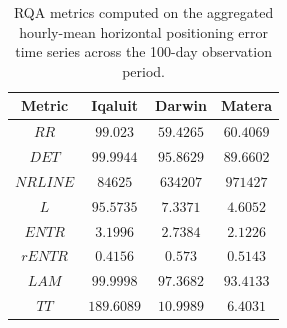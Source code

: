 \vspace{-3pt}
\begin{table}[H]
\caption{RQA metrics computed on the aggregated hourly-mean horizontal positioning error time series across the 100-day observation period.\label{tab:hourly_mean_rqa}}
\begin{tabularx}{\textwidth}{CCCC}
\toprule
\textbf{Metric} & \textbf{Iqaluit} & \textbf{Darwin} & \textbf{Matera} \\
\midrule
$RR$ & $99.023$ & $59.4265$ & $60.4069$ \\
$DET$ & $99.9944$ & $95.8629$ & $89.6602$ \\
$NRLINE$ & $84625$ & $634207$ & $971427$ \\
$L$ & $95.5735$ & $7.3371$ & $4.6052$ \\
$ENTR$ & $3.1996$ & $2.7384$ & $2.1226$ \\
$rENTR$ & $0.4156$ & $0.573$ & $0.5143$ \\
$LAM$ & $99.9998$ & $97.3682$ & $93.4133$ \\
$TT$ & $189.6089$ & $10.9989$ & $6.4031$ \\
\bottomrule
\end{tabularx}
\end{table}
\vspace{-3pt}

